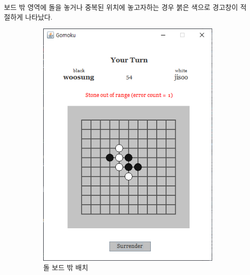 \documentclass[a4paper, 10pt]{article}
\begin{document}
보드 밖 영역에 돌을 놓거나 중복된 위치에 놓고자하는 경우 붉은 색으로 경고창이
적절하게 나타났다.
\begin{figure}[h]
  \centering
  \begin{subfigure}{.3\textwidth}
    \centering
    \includegraphics[width=.9\linewidth]{resource/out_of_board}
    \caption{돌 보드 밖 배치}
    \label{fig:out_of_board}
  \end{subfigure}
  \begin{subfigure}{.3\textwidth}
    \centering

\end{subfigure}
\end{figure}
\end{document}
